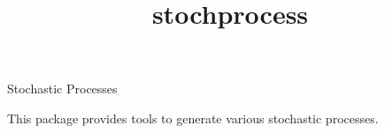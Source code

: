 \documentclass[12pt]{article}
\begin{document}
\begin{titlepage}

\title{stochprocess}{Stochastic Processes}

This package provides tools to generate various stochastic processes.

\vfill
\end{titlepage}


\tableofcontents
{}





































%





%
%
\end{document}
